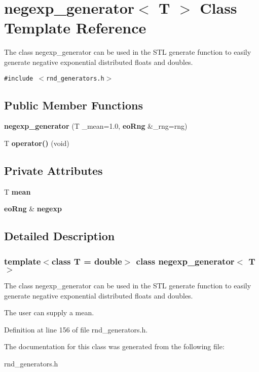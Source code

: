 \section{negexp\_\-generator$<$ T $>$ Class Template Reference}
\label{classnegexp__generator}
The class negexp\_\-generator can be used in the STL generate function to easily generate negative exponential distributed floats and doubles.  


{\tt \#include $<$rnd\_\-generators.h$>$}

\subsection*{Public Member Functions}
\begin{CompactItemize}
\item 
{\bf negexp\_\-generator} (T \_\-mean=1.0, {\bf eo\-Rng} \&\_\-rng=rng)\label{classnegexp__generator_a0}

\item 
T {\bf operator()} (void)\label{classnegexp__generator_a1}

\end{CompactItemize}
\subsection*{Private Attributes}
\begin{CompactItemize}
\item 
T {\bf mean}\label{classnegexp__generator_r0}

\item 
{\bf eo\-Rng} \& {\bf negexp}\label{classnegexp__generator_r1}

\end{CompactItemize}


\subsection{Detailed Description}
\subsubsection*{template$<$class T = double$>$ class negexp\_\-generator$<$ T $>$}

The class negexp\_\-generator can be used in the STL generate function to easily generate negative exponential distributed floats and doubles. 

The user can supply a mean. 



Definition at line 156 of file rnd\_\-generators.h.

The documentation for this class was generated from the following file:\begin{CompactItemize}
\item 
rnd\_\-generators.h\end{CompactItemize}
